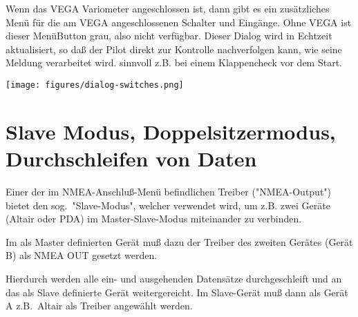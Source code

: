 Wenn das VEGA Variometer angeschlossen ist, dann gibt es ein zusätzliches Menü für die am VEGA angeschlossenen Schalter und Eingänge. Ohne VEGA ist dieser MenüButton grau, also nicht verfügbar.
Dieser Dialog wird in Echtzeit aktualisiert, so daß der Pilot direkt zur Kontrolle nachverfolgen kann, wie seine Meldung verarbeitet wird. sinnvoll z.B. bei einem Klappencheck vor dem Start.


\begin{center}
\texttt{[image: figures/dialog-switches.png]}
\end{center}
\section{Slave Modus, Doppelsitzermodus,  Durchschleifen von Daten}

Einer der im NMEA-Anschluß-Menü befindlichen Treiber ("NMEA-Output") bietet den sog.\   "Slave-Modus", welcher verwendet wird,  um z.B. zwei Geräte  (\textsf{Altair} oder \textsf{PDA})  im Master-Slave-Modus miteinander zu verbinden.


Im als Master definierten Gerät muß dazu der Treiber des zweiten  Gerätes (Gerät B) als NMEA OUT gesetzt werden.

Hierdurch werden alle ein- und ausgehenden Datensätze  durchgeschleift und an das als Slave definierte Gerät weitergereicht.
Im Slave-Gerät muß dann als Gerät A z.B.\ \textsf{Altair} als Treiber angewählt werden.

